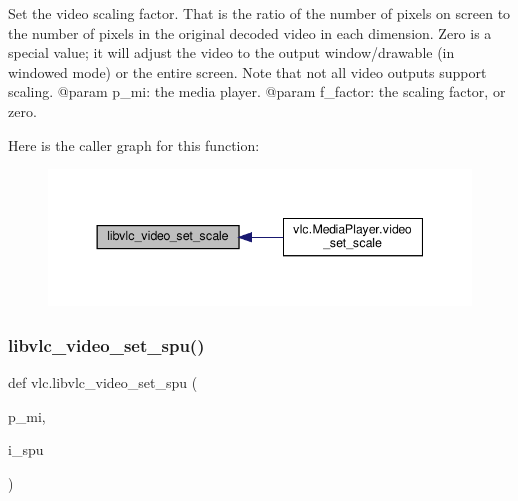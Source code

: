 \begin{DoxyVerb}Set the video scaling factor. That is the ratio of the number of pixels on
screen to the number of pixels in the original decoded video in each
dimension. Zero is a special value; it will adjust the video to the output
window/drawable (in windowed mode) or the entire screen.
Note that not all video outputs support scaling.
@param p_mi: the media player.
@param f_factor: the scaling factor, or zero.
\end{DoxyVerb}
 Here is the caller graph for this function\+:
\nopagebreak
\begin{figure}[H]
\begin{center}
\leavevmode
\includegraphics[width=344pt]{namespacevlc_afd16d3990030b2fa33195d13e9c0bb27_icgraph}
\end{center}
\end{figure}
\mbox{\label{namespacevlc_a429c12d1cb5157663d43472108bd1eeb}} 
\subsubsection{\texorpdfstring{libvlc\+\_\+video\+\_\+set\+\_\+spu()}{libvlc\_video\_set\_spu()}}
{\footnotesize\ttfamily def vlc.\+libvlc\+\_\+video\+\_\+set\+\_\+spu (\begin{DoxyParamCaption}\item[{}]{p\+\_\+mi,  }\item[{}]{i\+\_\+spu }\end{DoxyParamCaption})}

